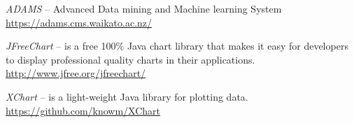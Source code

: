 %

\begin{thebibliography}{999}

		\textit{ADAMS} -- Advanced Data mining and Machine learning System \\
		\url{https://adams.cms.waikato.ac.nz/}{}

		\textit{JFreeChart} -- is a free 100\% Java chart library that
		makes it easy for developers to display professional quality
		charts in their applications. \\
		\url{http://www.jfree.org/jfreechart/}{}

		\textit{XChart} -- is a light-weight Java library for plotting data. \\
		\url{https://github.com/knowm/XChart}{}

\end{thebibliography}
